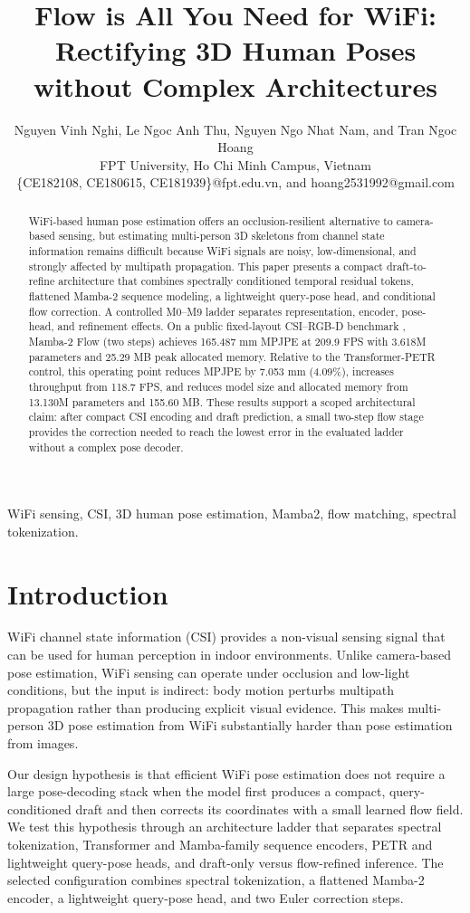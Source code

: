 \documentclass[conference,onecolumn]{IEEEtran}
\title{Flow is All You Need for WiFi: Rectifying 3D Human Poses without Complex Architectures}
\author{
Nguyen Vinh Nghi,  Le Ngoc Anh Thu,  Nguyen Ngo Nhat Nam, and Tran Ngoc Hoang\\
FPT University, Ho Chi Minh Campus, Vietnam\\
\{CE182108, CE180615, CE181939\}@fpt.edu.vn, and hoang2531992@gmail.com}
\begin{document}
\maketitle

\begin{abstract}
WiFi-based human pose estimation offers an occlusion-resilient alternative to camera-based sensing, but estimating multi-person 3D skeletons from channel state information remains difficult because WiFi signals are noisy, low-dimensional, and strongly affected by multipath propagation. This paper presents a compact draft-to-refine architecture that combines spectrally conditioned temporal residual tokens, flattened Mamba-2 sequence modeling, a lightweight query-pose head, and conditional flow correction. A controlled M0--M9 ladder separates representation, encoder, pose-head, and refinement effects. On a public fixed-layout CSI--RGB-D benchmark \cite{yan2024personwifi3d}, Mamba-2 Flow (two steps) achieves 165.487 mm MPJPE at 209.9 FPS with 3.618M parameters and 25.29 MB peak allocated memory. Relative to the Transformer-PETR control, this operating point reduces MPJPE by 7.053 mm (4.09\%), increases throughput from 118.7 FPS, and reduces model size and allocated memory from 13.130M parameters and 155.60 MB. These results support a scoped architectural claim: after compact CSI encoding and draft prediction, a small two-step flow stage provides the correction needed to reach the lowest error in the evaluated ladder without a complex pose decoder.
\end{abstract}

\begin{IEEEkeywords}
WiFi sensing, CSI, 3D human pose estimation, Mamba2, flow matching, spectral tokenization.
\end{IEEEkeywords}

\section{Introduction}
WiFi channel state information (CSI) provides a non-visual sensing signal that can be used for human perception in indoor environments. Unlike camera-based pose estimation, WiFi sensing can operate under occlusion and low-light conditions, but the input is indirect: body motion perturbs multipath propagation rather than producing explicit visual evidence. This makes multi-person 3D pose estimation from WiFi substantially harder than pose estimation from images.

Our design hypothesis is that efficient WiFi pose estimation does not require a large pose-decoding stack when the model first produces a compact, query-conditioned draft and then corrects its coordinates with a small learned flow field. We test this hypothesis through an architecture ladder that separates spectral tokenization, Transformer and Mamba-family sequence encoders, PETR and lightweight query-pose heads, and draft-only versus flow-refined inference. The selected configuration combines spectral tokenization, a flattened Mamba-2 encoder, a lightweight query-pose head, and two Euler correction steps.
\end{document}
